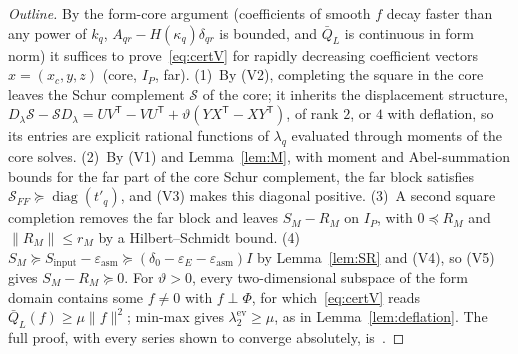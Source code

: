 \documentclass[11pt]{amsart}
\newcommand{\ev}{\mathrm{ev}}
\newcommand{\Tp}{\mathsf T}
\theoremstyle{definition}
\theoremstyle{remark}
\numberwithin{equation}{section}
\begin{document}
\begin{proof}[Outline]
By the form-core argument (coefficients of smooth $f$ decay faster than any power of $k_q$, $A_{qr}-H(\kappa_q)\delta_{qr}$ is bounded, and $\bar Q_L$ is continuous in form norm) it suffices to prove~\eqref{eq:certV} for rapidly decreasing coefficient vectors $x=(x_c,y,z)$ (core, $I_P$, far). (1)~By (V2), completing the square in the core leaves the Schur complement $\mathcal S$ of the core; it inherits the displacement structure, $D_\lambda\mathcal S-\mathcal SD_\lambda=UV^{\Tp}-VU^{\Tp}+\vartheta(YX^{\Tp}-XY^{\Tp})$, of rank $2$, or $4$ with deflation, so its entries are explicit rational functions of $\lambda_q$ evaluated through moments of the core solves. (2)~By (V1) and Lemma~\ref{lem:M}, with moment and Abel-summation bounds for the far part of the core Schur complement, the far block satisfies $\mathcal S_{FF}\succeq\operatorname{diag}(t'_q)$, and (V3) makes this diagonal positive. (3)~A second square completion removes the far block and leaves $S_M-R_M$ on $I_P$, with $0\preceq R_M$ and $\|R_M\|\le r_M$ by a Hilbert--Schmidt bound. (4)~$S_M\succeq S_{\mathrm{input}}-\varepsilon_{\mathrm{asm}}\succeq(\delta_0-\varepsilon_E-\varepsilon_{\mathrm{asm}})I$ by Lemma~\ref{lem:SR} and (V4), so (V5) gives $S_M-R_M\succeq0$. For $\vartheta>0$, every two-dimensional subspace of the form domain contains some $f\ne0$ with $f\perp\Phi$, for which~\eqref{eq:certV} reads $\bar Q_L(f)\ge\mu\|f\|^2$; min-max gives $\lambda_2^\ev\ge\mu$, as in Lemma~\ref{lem:deflation}. The full proof, with every series shown to converge absolutely, is~\cite[P3, P19--P23 and \S8]{supp}.
\end{proof}
\end{document}

